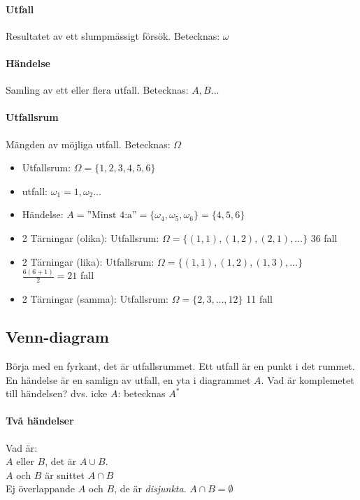 \documentclass[12pt]{article} %
\begin{document}
\paragraph{Utfall}
Resultatet av ett slumpmässigt försök. Betecknas: $\omega$
\paragraph{Händelse}
Samling av ett eller flera utfall. Betecknas: $A, B \ldots$
\paragraph{Utfallsrum}
Mängden av möjliga utfall. Betecknas: $\Omega$

\begin{itemize}
    \item Utfallsrum: $\Omega = \{1,2,3,4,5,6\}$
    \item utfall: $\omega_1 = 1, \omega_2 \ldots$
    \item Händelse: $A = \text{''Minst 4:a''} = \{\omega_4 , \omega_5 , \omega_6\} = \{4,5,6\}$
    \item 2 Tärningar (olika): Utfallsrum: $\Omega = \{(1,1),(1,2),(2,1), \ldots\}$ 36 fall
    \item 2 Tärningar (lika): Utfallsrum: $\Omega = \{(1,1),(1,2),(1,3), \ldots\}$ $\frac{6(6 + 1)}{2} = 21$ fall
    \item 2 Tärningar (samma): Utfallsrum: $\Omega = \{2,3, \ldots , 12\}$ 11 fall
\end{itemize}

\subsection{Venn-diagram}
Börja med en fyrkant, det är utfallsrummet. Ett utfall är en punkt i det rummet. En händelse är en samlign av utfall, en yta i diagrammet $A$. Vad är komplemetet till händelsen? dvs. icke $A$: betecknas $A^*$

\paragraph{Två händelser} 
Vad är: \\
$A$ eller $B$, det är $A \cup B$. \\
$A$ och $B$ är snittet $A \cap B$ \\
Ej överlappande $A$ och $B$, de är \textit{disjunkta}. $A \cap B = \emptyset$ \\
\end{document}
